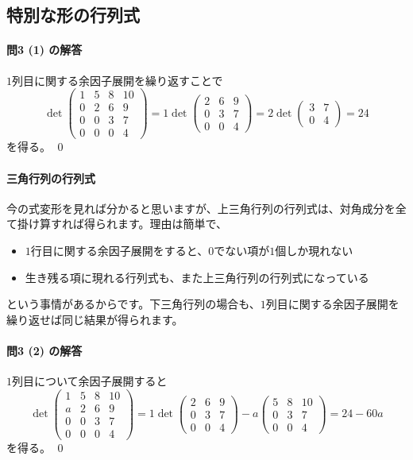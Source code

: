 \subsection{特別な形の行列式}

\paragraph{問3 (1) の解答} $1$列目に関する余因子展開を繰り返すことで
\[
\det
\begin{pmatrix}
1 & 5 & 8 & 10 \\
0 & 2 & 6 & 9 \\
0 & 0 & 3 & 7 \\
0 & 0 & 0 & 4
\end{pmatrix}
= 1 \det
\begin{pmatrix}
2 & 6 & 9 \\
0 & 3 & 7 \\
0 & 0 & 4
\end{pmatrix}
= 2 \det
\begin{pmatrix}
3 & 7 \\
0 & 4
\end{pmatrix}
= 24
\]
を得る。 \qed

\paragraph{三角行列の行列式}
今の式変形を見れば分かると思いますが、上三角行列の行列式は、対角成分を全て掛け算すれば得られます。理由は簡単で、
\begin{itemize}
\item $1$行目に関する余因子展開をすると、$0$でない項が$1$個しか現れない
\item 生き残る項に現れる行列式も、また上三角行列の行列式になっている
\end{itemize}
という事情があるからです。下三角行列の場合も、$1$列目に関する余因子展開を繰り返せば同じ結果が得られます。

\paragraph{問3 (2) の解答} $1$列目について余因子展開すると
\[
\det
\begin{pmatrix}
1 & 5 & 8 & 10 \\
a & 2 & 6 & 9 \\
0 & 0 & 3 & 7 \\
0 & 0 & 0 & 4
\end{pmatrix}
= 1 \det
\begin{pmatrix}
2 & 6 & 9 \\
0 & 3 & 7 \\
0 & 0 & 4
\end{pmatrix}
- a
\begin{pmatrix}
5 & 8 & 10 \\
0 & 3 & 7 \\
0 & 0 & 4
\end{pmatrix}
= 24 - 60a
\]
を得る。 \qed

